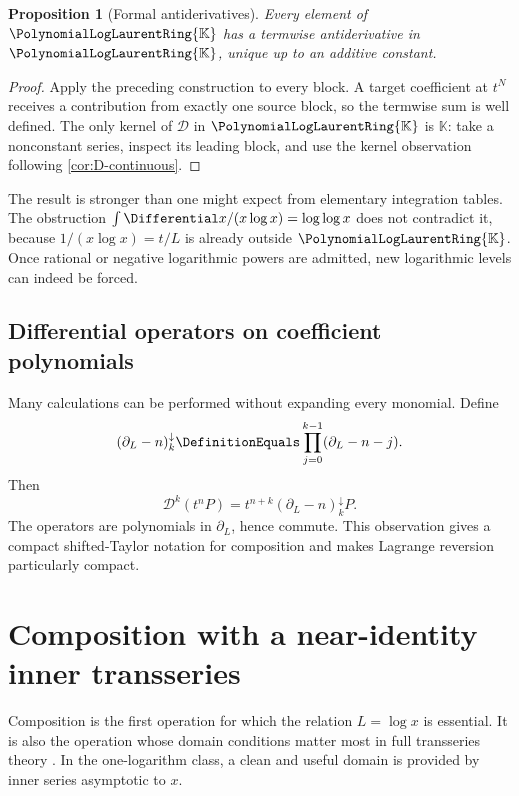 \documentclass[11pt]{article}
\theoremstyle{pltheorem}
\newtheorem{proposition}[theorem]{Proposition}
\newcommand{\K}{\mathbb K}
\newcommand{\PLL}{\PolynomialLogLaurentRing{\K}}
\newcommand{\D}{\mathcal D}
\begin{document}
\begin{proposition}[Formal antiderivatives]\label{prop:formal-antiderivatives}
Every element of \(\PLL\) has a termwise antiderivative in \(\PLL\), unique up to an additive constant.
\end{proposition}

\begin{proof}
Apply the preceding construction to every block.  A target coefficient at \(t^N\) receives a contribution from exactly one source block, so the termwise sum is well defined.  The only kernel of \(\D\) in \(\PLL\) is \(\K\): take a nonconstant series, inspect its leading block, and use the kernel observation following \cref{cor:D-continuous}.
\end{proof}

The result is stronger than one might expect from elementary integration tables.  The obstruction \(\int \Differential x/(x\log x)=\log\log x\) does not contradict it, because \(1/(x\log x)=t/L\) is already outside \(\PLL\).  Once rational or negative logarithmic powers are admitted, new logarithmic levels can indeed be forced.

\subsection{Differential operators on coefficient polynomials}

Many calculations can be performed without expanding every monomial.  Define
\begin{equation}\label{eq:falling-D-operator}
 (\partial_L-n)_{k}^{\downarrow}
 \DefinitionEquals\prod_{j=0}^{k-1}(\partial_L-n-j).
\end{equation}
Then
\[
 \D^k(t^nP)=t^{n+k}(\partial_L-n)_{k}^{\downarrow}P.
\]
The operators are polynomials in \(\partial_L\), hence commute.  This observation gives a compact shifted-Taylor notation for composition and makes Lagrange reversion particularly compact.

\section{Composition with a near-identity inner transseries}
\label{sec:composition}

Composition is the first operation for which the relation \(L=\log x\) is essential.  It is also the operation whose domain conditions matter most in full transseries theory \cite{edgar-composition,vanderhoeven-book}.  In the one-logarithm class, a clean and useful domain is provided by inner series asymptotic to \(x\).
\end{document}
